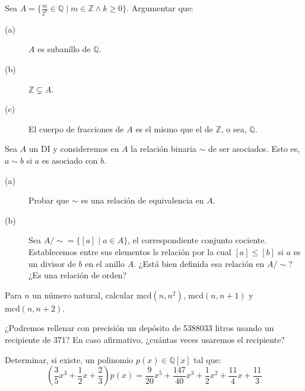 \begin{ejercicio}
    Sea $A=\{ \frac{m}{2^k} \in \mathbb{Q} \mid m \in \mathbb{Z} \land k \geq 0\}$. Argumentar que:
    \begin{description}
        \item [(a)] $A$ es subanillo de $\mathbb{Q}$.
        \item [(b)] $\mathbb{Z}\subsetneq A$.
        \item [(c)] El cuerpo de fracciones de $A$ es el mismo que el de $\mathbb{Z}$, o sea, $\mathbb{Q}$.
    \end{description}
\end{ejercicio}

\begin{ejercicio}
    Sea $A$ un DI y consideremos en $A$ la relación binaria $\sim$ de ser asociados. Esto es, $a\sim b$ si $a$ es asociado con $b$.
    \begin{description}
        \item [(a)] Probar que $\sim$ es una relación de equivalencia en $A$.
        \item [(b)] Sea $A/\sim = \{[a] \mid a\in A\}$, el correspondiente conjunto cociente. Establecemos entre sus elementos ls relación por la cual $[a]\leq [b]$ si $a$ es un divisor de $b$ en el anillo $A$. ¿Está bien definida esa relación en $A/\sim$? ¿Es una relación de orden?
    \end{description}
\end{ejercicio}

\begin{ejercicio}
    Para $n$ un número natural, calcular $\text{mcd}(n,n^2)$, $\text{mcd}(n,n+1)$ y $\text{mcd}(n,n+2)$.
\end{ejercicio}

\begin{ejercicio}
    ¿Podremos rellenar con precisión un depósito de 5388033 litros usando un recipiente de 371? En caso afirmativo, ¿cuántas veces usaremos el recipiente?
\end{ejercicio}

\begin{ejercicio}
    Determinar, si existe, un polinomio $p(x)\in \mathbb{Q}[x]$ tal que:
    \begin{equation*}
        \left(\dfrac{3}{5}x^3+\dfrac{1}{2}x+\dfrac{2}{3}\right)p(x) = \dfrac{9}{20}x^5 + \dfrac{147}{40}x^3+\dfrac{1}{2}x^2+\dfrac{11}{4}x+\dfrac{11}{3}
    \end{equation*}
\end{ejercicio}

